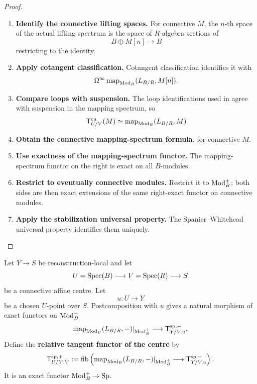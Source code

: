 \begin{proof}
\leavevmode
\begin{enumerate}[label=\textup{(\arabic*)}]
    \item \textbf{Identify the connective lifting spaces.}
    For connective \(M\), the \(n\)-th space of the actual lifting spectrum is the
    space of \(R\)-algebra sections of
    \[
        B\oplus M[n]\longrightarrow B
    \]
    restricting to the identity.
    \item \textbf{Apply cotangent classification.}
    Cotangent classification identifies it with
    \[
        \Omega^\infty
        \operatorname{map}_{\operatorname{Mod}_B}(L_{B/R},M[n]).
    \]
    \item \textbf{Compare loops with suspension.}
    The loop identifications used in
     agree with suspension in the mapping
    spectrum, so
    \[
        \mathsf T^{\mathrm{cn}}_{U/V}(M)
        \simeq
        \operatorname{map}_{\operatorname{Mod}_B}(L_{B/R},M)
    \]
    \item \textbf{Obtain the connective mapping-spectrum formula.}
    for connective \(M\).
    \item \textbf{Use exactness of the mapping-spectrum functor.}
    The mapping-spectrum functor on the right is exact on
    all \(B\)-modules.
    \item \textbf{Restrict to eventually connective modules.}
    Restrict it to \(\operatorname{Mod}_B^+\); both sides are then exact
    extensions of the same right-exact functor on connective modules.
    \item \textbf{Apply the stabilization universal property.}
    The
    Spanier--Whitehead universal property identifies them uniquely.
\end{enumerate}
\end{proof}

\begin{definition}
\label{def:relative-tangent-semantics-centre}
Let \(Y\to S\) be reconstruction-local and let
\[
    U=\operatorname{Spec}(B)\longrightarrow V=\operatorname{Spec}(R)\longrightarrow S
\]
be a connective affine centre. Let
\[
    u:U\longrightarrow Y
\]
be a chosen \(U\)-point over \(S\). Postcomposition with \(u\) gives a natural
morphism of exact functors on \(\operatorname{Mod}_B^+\)
\[
    \operatorname{map}_{\operatorname{Mod}_B}(L_{B/R},-)|_{\operatorname{Mod}_B^+}
    \longrightarrow
    \mathsf T^{\mathrm{sp},+}_{Y/V,u}.
\]
Define the \textbf{relative tangent functor of the centre} by
\[
    \mathsf T^{\mathrm{sp},+}_{U/Y;V}
    :=
    \operatorname{fib}
    \left(
        \operatorname{map}_{\operatorname{Mod}_B}(L_{B/R},-)|_{\operatorname{Mod}_B^+}
        \longrightarrow
        \mathsf T^{\mathrm{sp},+}_{Y/V,u}
    \right).
\]
It is an exact functor \(\operatorname{Mod}_B^+\to\operatorname{Sp}\).
\end{definition}

